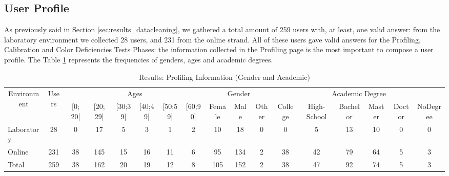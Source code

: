 \subsection{User Profile}
\label{subsec:results_userprofile}
%
As previously said in Section \ref{sec:results_datacleaning}, we gathered a total amount of 259 users with, at least, one valid answer: from the laboratory environment
we collected 28 users, and 231 from the online strand. All of these users gave valid answers for the Profiling, Calibration and Color Deficiencies Tests Phases: the information collected
in the Profiling page is the most important to compose a user profile. The Table \ref{table:profiling_genderacademic} represents the frequencies of genders, ages and
academic degrees. \par
%
\begin{table}[htbp]
  \resizebox{\textwidth}{!} {
    \begin{tabular}{| l || c || c | c | c | c | c | c || c | c | c || c | c | c | c | c | c |}
      \hline
      \multicolumn{1}{|c||}{\multirow{2}{*}{Environment}} & \multirow{2}{*}{Users} & \multicolumn{6}{c||}{Ages}                                                           & \multicolumn{3}{c||}{Gender} & \multicolumn{6}{c|}{Academic Degree}                          \\ \cline{3-17}
      \multicolumn{1}{|c||}{}                             &                        & {[}0; 20{[} & {[}20; 29{]} & {[}30;39{]} & {[}40;49{]} & {[}50;59{]} & {[}60;90{]} & Female   & Male   & Other   & College & High-School & Bachelor & Master & Doctor & NoDegree \\ \hline
      Laboratory                                         & 28                     & 0           & 17           & 5           & 3           & 1           & 2            & 10       & 18     & 0        & 0       & 5           & 13       & 10     & 0      & 0        \\ \hline
      Online                                             & 231                    & 38          & 145          & 15          & 16          & 11          & 6            & 95       & 134    & 2        & 38      & 42          & 79       & 64     & 5      & 3        \\ \hline \hline
      Total                                              & 259                    & 38          & 162          & 20          & 19          & 12          & 8            & 105      & 152    & 2        & 38      & 47          & 92       & 74     & 5      & 3        \\ \hline
    \end{tabular}}
  \caption[Results: Profiling Information (Gender and Academic)]{Results: Profiling Information (Gender and Academic)}
  \vspace{-5pt}
  \label{table:profiling_genderacademic}
\end{table}
